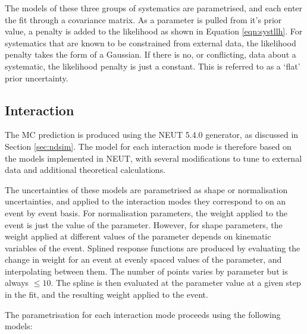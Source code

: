 The models of these three groups of systematics are parametrised, and each enter the fit through a covariance matrix. As a parameter is pulled from it's prior value, a penalty is added to the likelihood as shown in Equation \ref{eqn:systllh}. For systematics that are known to be constrained from external data, the likelihood penalty takes the form of a Gaussian. If there is no, or conflicting, data about a systematic, the likelihood penalty is just a constant. This is referred to as a `flat' prior uncertainty.

\subsection{Interaction}\label{sec:xsec}

The MC prediction is produced using the NEUT 5.4.0 generator\cite{neut}, as discussed in Section \ref{sec:ndsim}. The model for each interaction mode is therefore based on the models implemented in NEUT, with several modifications to tune to external data and additional theoretical calculations.

The uncertainties of these models are parametrised as shape or normalisation uncertainties, and applied to the interaction modes they correspond to on an event by event basis. For normalisation parameters, the weight applied to the event is just the value of the parameter. However, for shape parameters, the weight applied at different values of the parameter depends on kinematic variables of the event. Splined response functions are produced by evaluating the change in weight for an event at evenly spaced values of the parameter, and interpolating between them. The number of points varies by parameter but is always $\leq 10$. The spline is then evaluated at the parameter value at a given step in the fit, and the resulting weight applied to the event.

The parametrisation for each interaction mode proceeds using the following models:

